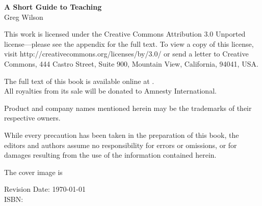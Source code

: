 \newpage

\thispagestyle{empty}

\small
\noindent \textbf{A Short Guide to Teaching} \\
Greg Wilson

\vspace{0.15cm}

\noindent
This work is licensed under the Creative Commons Attribution 3.0
Unported license---please see the appendix for the full text.
To view a copy of this license, visit
http://creativecommons.org/licenses/by/3.0/ or send a letter to Creative
Commons, 444 Castro Street, Suite 900, Mountain View, California,
94041, USA.

\vspace{0.15cm}

\noindent
The full text of this book is available online at .\\
All royalties from its sale will be donated to Amnesty International.\\

\vfill

\noindent
Product and company names mentioned herein may be the trademarks of
their respective owners.\\

\vspace{0.15cm}

\noindent
While every precaution has been taken in the preparation of this
book, the editors and authors assume no responsibility for errors or omissions,
or for damages resulting from the use of the information contained herein.\\

\vspace{0.15cm}

\noindent
The cover image is \\

\vspace{1cm}

\noindent
Revision Date: \today \\

\noindent
ISBN: 

\normalsize

\newpage

\thispagestyle{empty}
\mbox{}    %

\newpage
\tableofcontents
\newpage
\listoffigures
\newpage
\listoftables

